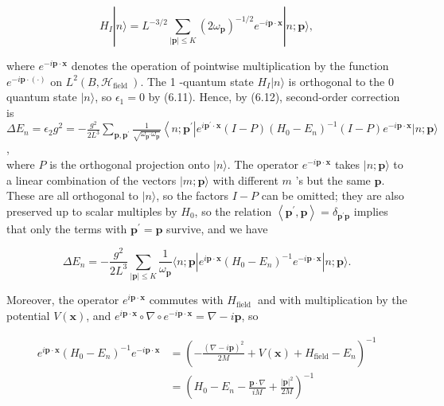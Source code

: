 \documentclass[10pt, letterpaper]{article}
\begin{document}
$$
H_{I}|n\rangle=L^{-3 / 2} \sum_{|\mathbf{p}| \leq K}\left(2 \omega_{\mathbf{p}}\right)^{-1 / 2} e^{-i \mathbf{p} \cdot \mathbf{x}}|n ; \mathbf{p}\rangle,
$$

where $e^{-i \mathbf{p} \cdot \mathbf{x}}$ denotes the operation of pointwise multiplication by the function $e^{-i \mathbf{p} \cdot(\cdot)}$ on $L^{2}\left(B, \mathcal{H}_{\text {field }}\right)$. The 1 -quantum state $H_{I}|n\rangle$ is orthogonal to the 0 quantum state $|n\rangle$, so $\epsilon_{1}=0$ by (6.11). Hence, by (6.12), second-order correction is\\
$\Delta E_{n}=\epsilon_{2} g^{2}=-\frac{g^{2}}{2 L^{3}} \sum_{\mathbf{p}, \mathbf{p}^{\prime}} \frac{1}{\sqrt{\omega_{\mathbf{p}^{\prime}} \omega_{\mathbf{p}}}}\left\langle n ; \mathbf{p}^{\prime}\right| e^{i \mathbf{p}^{\prime} \cdot \mathbf{x}}(I-P)\left(H_{0}-E_{n}\right)^{-1}(I-P) e^{-i \mathbf{p} \cdot \mathbf{x}}|n ; \mathbf{p}\rangle$,\\
where $P$ is the orthogonal projection onto $|n\rangle$. The operator $e^{-i \mathbf{p} \cdot \mathbf{x}}$ takes $|n ; \mathbf{p}\rangle$ to a linear combination of the vectors $|m ; \mathbf{p}\rangle$ with different $m$ 's but the same $\mathbf{p}$. These are all orthogonal to $|n\rangle$, so the factors $I-P$ can be omitted; they are also preserved up to scalar multiples by $H_{0}$, so the relation $\left\langle\mathbf{p}^{\prime}, \mathbf{p}\right\rangle=\delta_{\mathbf{p}^{\prime} \mathbf{p}}$ implies that only the terms with $\mathbf{p}^{\prime}=\mathbf{p}$ survive, and we have

$$
\Delta E_{n}=-\frac{g^{2}}{2 L^{3}} \sum_{|\mathbf{p}| \leq K} \frac{1}{\omega_{\mathbf{p}}}\langle n ; \mathbf{p}| e^{i \mathbf{p} \cdot \mathbf{x}}\left(H_{0}-E_{n}\right)^{-1} e^{-i \mathbf{p} \cdot \mathbf{x}}|n ; \mathbf{p}\rangle .
$$

Moreover, the operator $e^{i \mathbf{p} \cdot \mathbf{x}}$ commutes with $H_{\text {field }}$ and with multiplication by the potential $V(\mathbf{x})$, and $e^{i \mathbf{p} \cdot \mathbf{x}} \circ \nabla \circ e^{-i \mathbf{p} \cdot \mathbf{x}}=\nabla-i \mathbf{p}$, so

$$
\begin{aligned}
e^{i \mathbf{p} \cdot \mathbf{x}}\left(H_{0}-E_{n}\right)^{-1} e^{-i \mathbf{p} \cdot \mathbf{x}} & =\left(-\frac{(\nabla-i \mathbf{p})^{2}}{2 M}+V(\mathbf{x})+H_{\mathrm{field}}-E_{n}\right)^{-1} \\
& =\left(H_{0}-E_{n}-\frac{\mathbf{p} \cdot \nabla}{i M}+\frac{|\mathbf{p}|^{2}}{2 M}\right)^{-1}
\end{aligned}
$$
\end{document}
